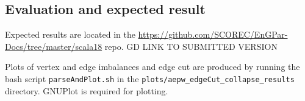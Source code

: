 \subsection{Evaluation and expected result}

Expected results are located in the 
\url{https://github.com/SCOREC/EnGPar-Docs/tree/master/scala18}
repo.
{\color{red} GD LINK TO SUBMITTED VERSION}

Plots of vertex and edge imbalances and edge cut are produced by
running the bash script \texttt{parseAndPlot.sh} in the
\texttt{plots/aepw\_edgeCut\_collapse\_results} directory.
GNUPlot is required for plotting.

